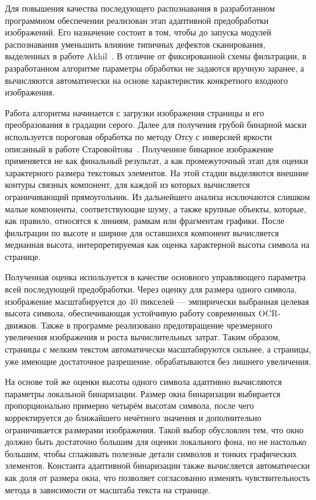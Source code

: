 Для повышения качества последующего распознавания в разработанном программном обеспечении реализован этап адаптивной предобработки изображений. Его назначение состоит в том, чтобы до запуска модулей распознавания уменьшить влияние типичных дефектов сканирования, выделенных в работе Akhil~\cite{refAkhil}. В отличие от фиксированной схемы фильтрации, в разработанном алгоритме параметры обработки не задаются вручную заранее, а вычисляются автоматически на основе характеристик конкретного входного изображения.

Работа алгоритма начинается с загрузки изображения страницы и его преобразования в градации серого. Далее для получения грубой бинарной маски используется пороговая обработка по методу Отсу с инверсией яркости описанный в работе Старовойтова~\cite{refStarovoytov}. Полученное бинарное изображение применяется не как финальный результат, а как промежуточный этап для оценки характерного размера текстовых элементов. На этой стадии выделяются внешние контуры связных компонент, для каждой из которых вычисляется ограничивающий прямоугольник. Из дальнейшего анализа исключаются слишком малые компоненты, соответствующие шуму, а также крупные объекты, которые, как правило, относятся к линиям, рамкам или фрагментам графики. После фильтрации по высоте и ширине для оставшихся компонент вычисляется медианная высота, интерпретируемая как оценка характерной высоты символа на странице.

Полученная оценка используется в качестве основного управляющего параметра всей последующей предобработки. Через оценку для размера одного символа, изображение масштабируется до 40 пикселей --- эмпирически выбранная целевая высота символа, обеспечивающая устойчивую работу современных OCR-движков. Также в программе реализовано предотвращение чрезмерного увеличения изображения и роста вычислительных затрат. Таким образом, страницы с мелким текстом автоматически масштабируются сильнее, а страницы, уже имеющие достаточное разрешение, обрабатываются без лишнего увеличения.

На основе той же оценки высоты одного символа адаптивно вычисляются параметры локальной бинаризации. Размер окна бинаризации выбирается пропорционально примерно четырём высотам символа, после чего корректируется до ближайшего нечётного значения и дополнительно ограничивается размерами изображения. Такой выбор обусловлен тем, что окно должно быть достаточно большим для оценки локального фона, но не настолько большим, чтобы сглаживать полезные детали символов и тонких графических элементов. Константа адаптивной бинаризации также вычисляется автоматически как доля от размера окна, что позволяет согласованно изменять чувствительность метода в зависимости от масштаба текста на странице.

